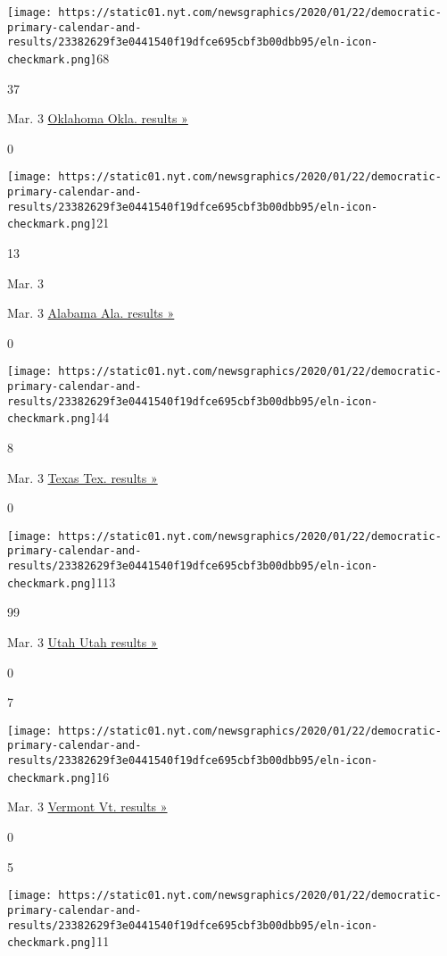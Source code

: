 \texttt{[image: https://static01.nyt.com/newsgraphics/2020/01/22/democratic-primary-calendar-and-results/23382629f3e0441540f19dfce695cbf3b00dbb95/eln-icon-checkmark.png]}68

37

Mar. 3
\href{https://www.nytimes.com/interactive/2020/03/03/us/elections/results-oklahoma-president-democrat-primary-election.html}{Oklahoma
Okla. results »}

0

\texttt{[image: https://static01.nyt.com/newsgraphics/2020/01/22/democratic-primary-calendar-and-results/23382629f3e0441540f19dfce695cbf3b00dbb95/eln-icon-checkmark.png]}21

13

Mar. 3

Mar. 3
\href{https://www.nytimes.com/interactive/2020/03/03/us/elections/results-alabama-president-democrat-primary-election.html}{Alabama
Ala. results »}

0

\texttt{[image: https://static01.nyt.com/newsgraphics/2020/01/22/democratic-primary-calendar-and-results/23382629f3e0441540f19dfce695cbf3b00dbb95/eln-icon-checkmark.png]}44

8

Mar. 3
\href{https://www.nytimes.com/interactive/2020/03/03/us/elections/results-texas-president-democrat-primary-election.html}{Texas
Tex. results »}

0

\texttt{[image: https://static01.nyt.com/newsgraphics/2020/01/22/democratic-primary-calendar-and-results/23382629f3e0441540f19dfce695cbf3b00dbb95/eln-icon-checkmark.png]}113

99

Mar. 3
\href{https://www.nytimes.com/interactive/2020/03/03/us/elections/results-utah-president-democrat-primary-election.html}{Utah
Utah results »}

0

7

\texttt{[image: https://static01.nyt.com/newsgraphics/2020/01/22/democratic-primary-calendar-and-results/23382629f3e0441540f19dfce695cbf3b00dbb95/eln-icon-checkmark.png]}16

Mar. 3
\href{https://www.nytimes.com/interactive/2020/03/03/us/elections/results-vermont-president-democrat-primary-election.html}{Vermont
Vt. results »}

0

5

\texttt{[image: https://static01.nyt.com/newsgraphics/2020/01/22/democratic-primary-calendar-and-results/23382629f3e0441540f19dfce695cbf3b00dbb95/eln-icon-checkmark.png]}11

